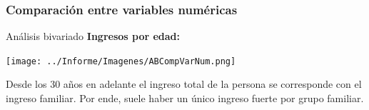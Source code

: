 \documentclass[pdf]{beamer}
\def\\{}%
\begin{document}
{    %
 
    \subsubsection{Comparación entre variables numéricas}
\begin{frame}{Análisis bivariado}
    \textbf{Ingresos por edad:}
    \begin{center}
        \texttt{[image: ../Informe/Imagenes/ABCompVarNum.png]}
    \end{center}
    Desde los 30 años en adelante el ingreso total de la persona se corresponde con el ingreso familiar. Por ende, suele haber un único ingreso fuerte por grupo familiar.
\end{frame}
 
}
\end{document}
